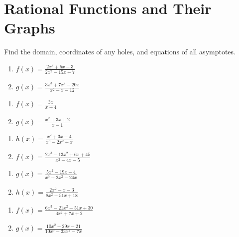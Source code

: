 \chapter{Rational Functions and Their Graphs}

Find the domain, coordinates of any holes, and equations of all asymptotes.
\begin{multicols}{2}
\begin{enumerate}
\setlength\itemsep{10pt}
	\item $f(x) = \frac{2x^2+5x-3}{2x^2-15x+7}$
	\item $g(x) = \frac{3x^3+7x^2-20x}{x^2-x-12}$
\end{enumerate} \setcounter{Review}{\value{enumi}}
\end{multicols}
\begin{multicols}{2}
\begin{enumerate}	\setcounter{enumi}{\value{Review}}
	\item $f(x) = \frac{3x}{x+4}$
	\item $g(x) = \frac{x^2+3x+2}{x-1}$
\end{enumerate} \setcounter{Review}{\value{enumi}}
\end{multicols}
\begin{multicols}{2}
\begin{enumerate}	\setcounter{enumi}{\value{Review}}
	\item $h(x) = \frac{x^2+3x-4}{x^3-2x^2+x}$
	\item $f(x) = \frac{2x^3-13x^2+6x+45}{x^2-4x-5}$
\end{enumerate} \setcounter{Review}{\value{enumi}}
\end{multicols}
\begin{multicols}{2}
\begin{enumerate}	\setcounter{enumi}{\value{Review}}
	\item $g(x) = \frac{5x^2-19x-4}{x^3+2x^2-24x}$
	\item $h(x) = \frac{2x^2-x-3}{8x^2+51x+18}$
\end{enumerate} \setcounter{Review}{\value{enumi}}
\end{multicols}
\begin{multicols}{2}
\begin{enumerate}	\setcounter{enumi}{\value{Review}}
	\item $f(x) = \frac{6x^3 - 21x^2 - 51x + 30}{3x^2+7x+2}$
	\item $g(x) = \frac{10x^2-29x-21}{10x^3-33x^2-7x}$
\end{enumerate} \setcounter{Review}{\value{enumi}}
\end{multicols}
